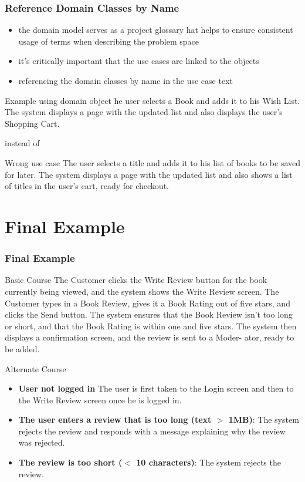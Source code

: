 \documentclass{beamer}
\begin{document}
\begin{frame}
  \frametitle{Reference Domain Classes by Name}
                                         
  \begin{itemize}
        \item the domain model serves as a project glossary                                                                    hat helps to
ensure consistent usage of terms when describing the problem space
        \item it’s critically important that the use cases are linked to the objects
       \item referencing the domain classes by name in the use case text
  \end{itemize}
  \begin{block}{Example using domain object}
   he user selects a Book and adds it to his Wish List. The system displays a page with the
updated list and also displays the user’s Shopping Cart.
  \end{block}
instead of
\begin{alertblock}{Wrong use case}
The user selects a title and adds it to his list of books to be saved for later. The system
displays a page with the updated list and also shows a list of titles in the user’s cart,
ready for checkout.
\end{alertblock}
 \end{frame}
 
\section{Final Example}
 
\begin{frame}
  \frametitle{Final Example}
\begin{block}{Basic Course}
The Customer clicks the Write Review button for the book currently being viewed, and
the system shows the Write Review screen. The Customer types in a Book Review, gives it
a Book Rating out of five stars, and clicks the Send button. The system ensures that the
Book Review isn’t too long or short, and that the Book Rating is within one and five
stars. The system then displays a confirmation screen, and the review is sent to a Moder-
ator, ready to be added.
\end{block} 
\end{frame}
 
\begin{frame}
	\begin{alertblock}{Alternate Course}
		\begin{itemize}
		  \item \textbf{User not logged in} The user is first taken to the 
		 	Login screen and then to the Write Review screen once he is logged in.
		  \item \textbf{The user enters a review that is too long (text $>$ 1MB)}: 
			The system rejects the review and responds with a message explaining why the
			review was rejected.
		\item \textbf{The review is too short ($<$ 10 characters)}: The system
		rejects the review.
		\end{itemize}
	\end{alertblock} 
\end{frame}
\end{document}
